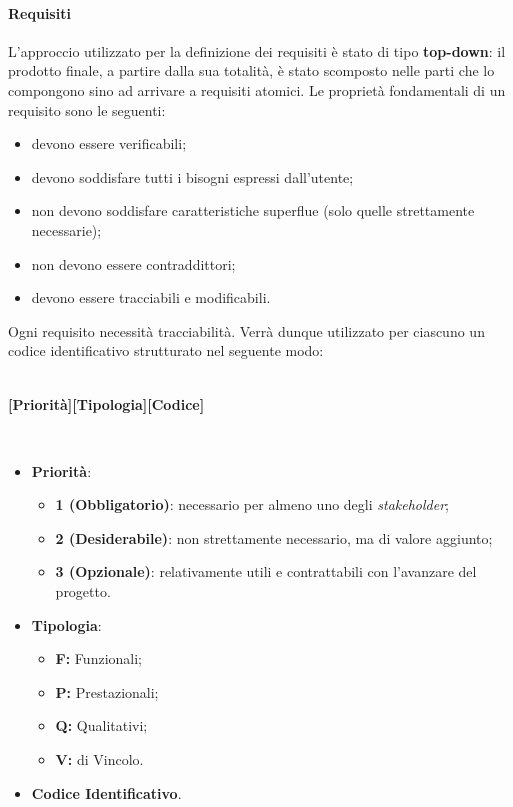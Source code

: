 \paragraph{Requisiti}
L'approccio utilizzato per la definizione dei requisiti è stato di tipo \textbf{top-down}: il prodotto finale, a partire dalla sua totalità, è stato scomposto nelle parti che lo compongono sino ad arrivare a requisiti atomici. Le proprietà fondamentali di un requisito sono le seguenti:
\begin{itemize}
	\item devono essere verificabili;
	\item devono soddisfare tutti i bisogni espressi dall'utente;
	\item non devono soddisfare caratteristiche superflue (solo quelle strettamente necessarie);
	\item non devono essere contraddittori;
	\item devono essere tracciabili e modificabili.
\end{itemize}  
\noindent Ogni requisito necessità tracciabilità. Verrà dunque utilizzato per ciascuno un codice identificativo strutturato nel seguente modo:
\\\\
\centerline{\textbf{[Priorità][Tipologia][Codice]}}\\
\begin{itemize}
  \item \textbf{Priorità}:
  \begin{itemize}
    \item \textbf{1 (Obbligatorio)}: necessario per almeno uno degli \textit{stakeholder\glos};
    \item \textbf{2 (Desiderabile)}: non strettamente necessario, ma di valore aggiunto;
    \item \textbf{3 (Opzionale)}: relativamente utili e contrattabili con l'avanzare del progetto.
  \end{itemize}
  \item \textbf{Tipologia}:
  \begin{itemize}
    \item \textbf{F:} Funzionali;
    \item \textbf{P:} Prestazionali;
    \item \textbf{Q:} Qualitativi;
    \item \textbf{V:} di Vincolo.
  \end{itemize}
  \item \textbf{Codice Identificativo}.
\end{itemize}

